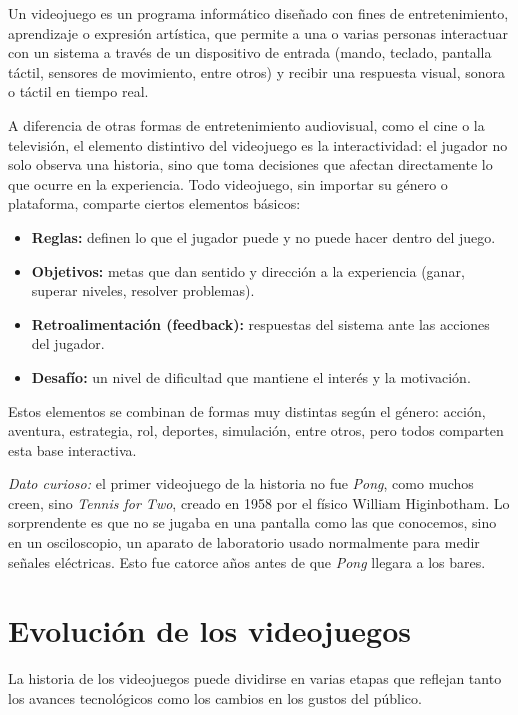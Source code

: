 \documentclass[12pt]{report}
\begin{document}
Un videojuego es un programa informático diseñado con fines de entretenimiento, aprendizaje o expresión artística, que permite a una o varias personas interactuar con un sistema a través de un dispositivo de entrada (mando, teclado, pantalla táctil, sensores de movimiento, entre otros) y recibir una respuesta visual, sonora o táctil en tiempo real.

A diferencia de otras formas de entretenimiento audiovisual, como el cine o la televisión, el elemento distintivo del videojuego es la interactividad: el jugador no solo observa una historia, sino que toma decisiones que afectan directamente lo que ocurre en la experiencia. Todo videojuego, sin importar su género o plataforma, comparte ciertos elementos básicos:

\begin{itemize}
    \item \textbf{Reglas:} definen lo que el jugador puede y no puede hacer dentro del juego.
    \item \textbf{Objetivos:} metas que dan sentido y dirección a la experiencia (ganar, superar niveles, resolver problemas).
    \item \textbf{Retroalimentación (feedback):} respuestas del sistema ante las acciones del jugador.
    \item \textbf{Desafío:} un nivel de dificultad que mantiene el interés y la motivación.
\end{itemize}

Estos elementos se combinan de formas muy distintas según el género: acción, aventura, estrategia, rol, deportes, simulación, entre otros, pero todos comparten esta base interactiva.

\textit{Dato curioso:} el primer videojuego de la historia no fue \textit{Pong}, como muchos creen, sino \textit{Tennis for Two}, creado en 1958 por el físico William Higinbotham. Lo sorprendente es que no se jugaba en una pantalla como las que conocemos, sino en un osciloscopio, un aparato de laboratorio usado normalmente para medir señales eléctricas. Esto fue catorce años antes de que \textit{Pong} llegara a los bares.

\section{Evolución de los videojuegos}

La historia de los videojuegos puede dividirse en varias etapas que reflejan tanto los avances tecnológicos como los cambios en los gustos del público.
\end{document}
